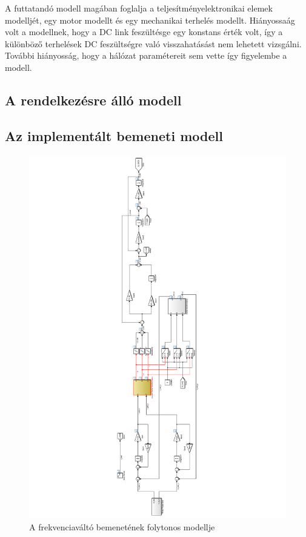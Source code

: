A futtatandó modell magában foglalja a teljesítményelektronikai elemek modelljét, egy motor modellt és egy mechanikai terhelés modellt. Hiányossaág volt a modellnek, hogy a DC link feszültésge egy konstans érték volt, így a különböző terhelések DC feszültségre való visszahatásást nem lehetett vizsgálni. További hiányosság, hogy a hálózat paramétereit sem vette így figyelembe a modell.

\subsection{A rendelkezésre álló modell}

\subsection{Az implementált bemeneti modell}

\begin{figure}[]
	\centering
	\includegraphics[width = \textwidth]{figures/model_continous.pdf}
	\caption{A frekvenciaváltó bemenetének folytonos modellje} 
	\label{fig:cont_input_model}
\end{figure}

